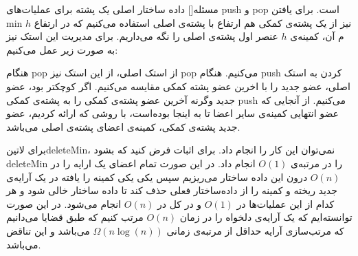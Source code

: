 
‌مسئله[]
داده ساختار اصلی یک پشته برای عملیات‌های push و pop است. برای یافتن min نیز از یک پشته‌ی کمکی هم ارتفاع با پشته‌ی اصلی استفاده می‌کنیم که در ارتفاع $h$م آن، کمینه‌ی $h$ عنصر اول پشته‌ی اصلی را نگه می‌داریم. برای مدیریت این استک نیز به صورت زیر عمل می‌کنیم:

هنگام pop از استک اصلی، از این استک نیز pop می‌کنیم.
هنگام push کردن به استک اصلی، عضو جدید را با اخرین عضو پشته  کمکی مقایسه می‌کنیم. اگر کوچکتر بود، عضو جدید وگرنه آخرین عضو پشته‌ی کمکی را به پشته‌ی کمکی push می‌کنیم. از آنجایی که عضو انتهایی کمینه‌ی سایر اعضا تا به اینجا بوده‌است، با روشی که ارائه کردیم، عضو جدید پشته‌ی کمکی، کمینه‌ی اعضای پشته‌ی اصلی می‌باشد.

برای
‌لاتین{deleteMin}،
نمی‌توان این کار را انجام داد. برای اثبات فرض کنید که بشود deleteMin را در مرتبه‌ی $O(1)$ انجام داد.
 در این صورت تمام اعضای یک ارایه را در $O(n)$ درون این داده ساختار می‌ریزیم سپس یکی یکی کمینه را یافته در یک آرایه‌ی جدید ریخته و کمینه را از داده‌ساختار فعلی حذف کند تا داده ساختار خالی شود و هر کدام از این عملیات‌ها در $O(1)$ و در کل در $O(n)$ انجام می‌شود. در این صورت
توانسته‌ایم که یک آرایه‌ی دلخواه را در زمان $O(n)$ مرتب کنیم که طبق قضایا می‌دانیم که مرتب‌سازی آرایه حداقل از مرتبه‌ی زمانی
$\Omega(n\log(n))$
می‌باشد و این تناقض می‌باشد.











